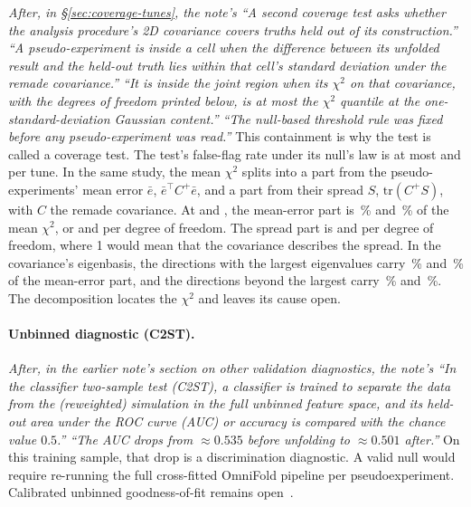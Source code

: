\emph{After, in \S\ref{sec:coverage-tunes}, the note's ``A second coverage test asks whether the analysis procedure's 2D covariance covers truths held out of its construction.'' ``A pseudo-experiment is inside a cell when the difference between its unfolded result and the held-out truth lies within that cell's standard deviation under the remade covariance.'' ``It is inside the joint region when its $\chi^{2}$ on that covariance, with the degrees of freedom printed below, is at most the $\chi^{2}$ quantile at the one-standard-deviation Gaussian content.'' ``The null-based threshold rule was fixed before any pseudo-experiment was read.''}
This containment is why the test is called a coverage test. The test's false-flag rate under its null's law is at most  and  per tune. In the same study, the mean $\chi^{2}$ splits into a part from the pseudo-experiments' mean error $\bar e$, $\bar e^{\top}C^{+}\bar e$, and a part from their spread $S$, $\mathrm{tr}(C^{+}S)$, with $C$ the remade covariance. At  and , the mean-error part is \,\% and \,\% of the mean $\chi^{2}$, or  and  per degree of freedom. The spread part is  and  per degree of freedom, where 1 would mean that the covariance describes the spread. In the covariance's eigenbasis, the  directions with the largest eigenvalues carry \,\% and \,\% of the mean-error part, and the directions beyond the  largest carry \,\% and \,\%. The decomposition locates the $\chi^{2}$ and leaves its cause open.

\paragraph{Unbinned diagnostic (C2ST).}
\emph{After, in the earlier note's section on other validation diagnostics, the note's ``In the classifier two-sample test (C2ST), a classifier is trained to separate the data from the (reweighted) simulation in the full unbinned feature space, and its held-out area under the ROC curve (AUC) or accuracy is compared with the chance value $0.5$.'' ``The AUC drops from $\approx0.535$ before unfolding to $\approx0.501$ after.''}
On this training sample, that drop is a discrimination diagnostic. A valid null would require re-running the full cross-fitted OmniFold pipeline per pseudoexperiment. Calibrated unbinned goodness-of-fit remains open~\cite{Canelli:2025guide}.
